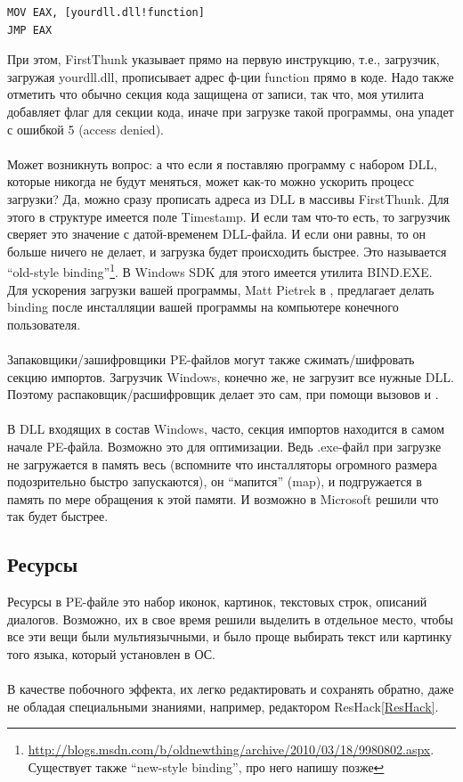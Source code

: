 \begin{lstlisting}
MOV EAX, [yourdll.dll!function]
JMP EAX
\end{lstlisting}

При этом, FirstThunk указывает прямо на первую инструкцию, т.е., загрузчик, загружая yourdll.dll, прописывает адрес
ф-ции function прямо в коде. Надо также отметить что обычно секция кода защищена от записи, так что, моя утилита
добавляет флаг  для секции кода, иначе при загрузке такой программы, она упадет с
ошибкой 5 (access denied). \\
\\
Может возникнуть вопрос: а что если я поставляю программу с набором DLL, которые никогда не будут меняться,
может как-то можно ускорить процесс загрузки? Да, можно сразу прописать адреса из DLL в массивы FirstThunk.
Для этого в структуре  имеется поле Timestamp. И если там что-то есть, то загрузчик
сверяет это значение с датой-временем DLL-файла. И если они равны, то он больше ничего не делает, и загрузка будет
происходить быстрее. 
Это называется ``old-style binding''\footnote{\url{http://blogs.msdn.com/b/oldnewthing/archive/2010/03/18/9980802.aspx}. Существует также ``new-style binding'', про него напишу позже}.
В Windows SDK для этого имеется утилита BIND.EXE.
Для ускорения загрузки вашей программы, Matt Pietrek в \cite{Pietrek1}, предлагает делать binding после инсталляции
вашей программы на компьютере конечного пользователя. \\
\\
Запаковщики/зашифровщики PE-файлов могут также сжимать/шифровать секцию импортов. Загрузчик Windows,
конечно же, не загрузит все нужные DLL. Поэтому распаковщик/расшифровщик делает это сам, при помощи
вызовов  и . \\
\\
В DLL входящих в состав Windows, часто, секция импортов находится в самом начале PE-файла.
Возможно это для оптимизации.
Ведь .exe-файл при загрузке не загружается в память весь (вспомните что инсталляторы огромного размера подозрительно
быстро запускаются), он ``мапится'' (map), и подгружается в память по мере
обращения к этой памяти. И возможно в Microsoft решили что так будет быстрее.

\subsection{Ресурсы}

Ресурсы в PE-файле это набор иконок, картинок, текстовых строк, описаний диалогов.
Возможно, их в свое время решили выделить в отдельное место, чтобы все эти вещи были мультиязычными,
и было проще выбирать текст или картинку того языка, который установлен в \ac{ОС}. \\
\\
В качестве побочного эффекта, их легко редактировать и сохранять обратно, даже не обладая специальными знаниями,
например, редактором ResHack\ref{ResHack}.

